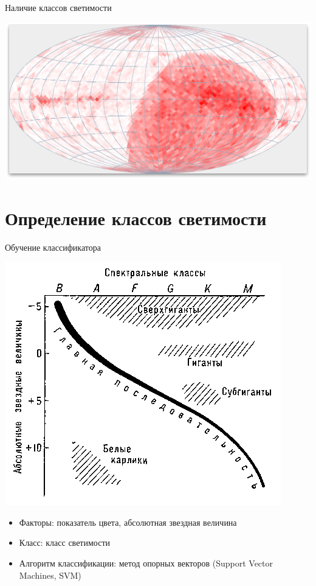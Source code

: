 \documentclass[14pt, fleqn, xcolor={dvipsnames, table}]{beamer}
\begin{document}
        \begin{frame}{Наличие классов светимости}
            \begin{center}
                \includegraphics[scale=0.32]{count-white.png}
            \end{center}             
        \end{frame}

    \section{Определение классов светимости}                
        
        \begin{frame}{Обучение классификатора}
            \begin{center}
                \includegraphics[scale=0.25]{gr-example.jpg}
            \end{center}
            \begin{itemize}
                \item Факторы: показатель цвета, абсолютная звездная величина
                \item Класс: класс светимости
                \item Алгоритм классификации: метод опорных векторов (Support Vector Machines, SVM)
            \end{itemize}
        \end{frame}        
        
\end{document}
